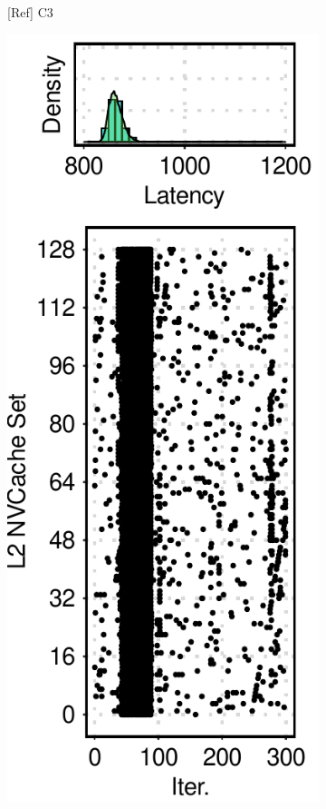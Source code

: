 \begin{figure}[t]
\begin{subfigure}[b]{.12\textwidth}
        \caption{[Ref] C3}
        \label{fig:12:ref:side-channel-feature-c3}
    \end{subfigure}
    \hfill
    \begin{subfigure}[b]{.12\textwidth}
        \centering
        \includegraphics[width=\linewidth]{figure/plot/reference/fig12-side-sql-q1.pdf}

\end{subfigure}
\end{figure}
